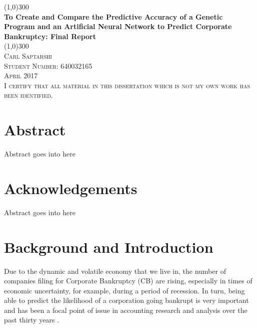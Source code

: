 \documentclass[11pt]{article}
\begin{document}
	\begin{titlepage}
		\begin{center}
			\line(1,0){300}\\
			[0.25in]
			\huge{\bfseries To Create and Compare the Predictive Accuracy of a Genetic Program and an Artificial Neural Network to Predict Corporate Bankruptcy: Final Report}\\
			\line(1,0){300}\\
			[0.25in]
			 \textsc{Carl Saptarshi}\\
			 \textsc{\large  Student Number: 640032165 \\
			 April 2017}\\
			 [10cm]
			 \textsc{\large  I certify that all material in this dissertation which is not my own work has been identified.} \\
		\end{center}
\end{titlepage}
\section*{Abstract}
Abstract goes into here
\cleardoublepage
\section*{Acknowledgements}
Abstract goes into here
\cleardoublepage
\tableofcontents
\cleardoublepage
{}
\setcounter{page}{1}
\section{Background and Introduction }\label{sec:intro}%
Due to the dynamic and volatile economy that we live in, the number of companies filing for Corporate Bankruptcy (CB) are rising, especially in times of economic uncertainty, for example, during a period of recession. In turn, being able to predict the likelihood of a corporation going bankrupt is very important and has been a focal point of issue in accounting research and analysis over the past thirty years \citep{ref-two,ref-one}.
\end{document}
